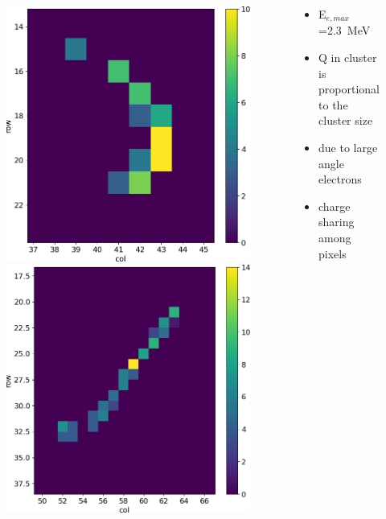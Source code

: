 \begin{frame}
\begin{columns}
\begin{figure}
                    \includegraphics[width=.3\linewidth]{figures/charaterization/evts/Sr90/10b.png} 
                    \includegraphics[width=.3\linewidth]{figures/charaterization/evts/Sr90/21a.png}
                \end{figure}
                \begin{itemize}
                    \item E$_{e, max}$=\SI{2.3}{MeV}
                    \item Q in cluster is proportional to the cluster size
                    \item due to large angle electrons
                    \item charge sharing among pixels 
                \end{itemize}
        \end{columns}
    \end{frame}    


